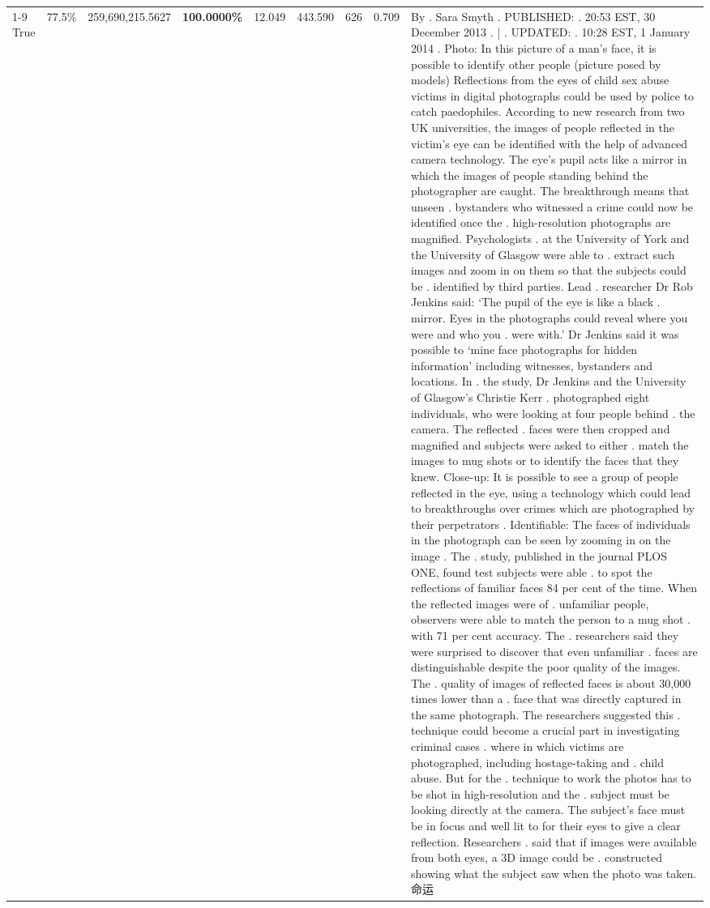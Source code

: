 \begin{table}[H]
\begin{tabular}{lllrlllll}
\cline{1-9}
True & 77.5\% & 259,690,215.5627 & \bfseries \color{red} 100.0000\% & 12.049 & 443.590 & 626 & 0.709 & By . Sara Smyth . PUBLISHED: . 20:53 EST, 30 December 2013 . | . UPDATED: . 10:28 EST, 1 January 2014 . Photo: In this picture of a man's face, it is possible to identify other people (picture posed by models) Reflections from the eyes of child sex abuse victims in digital photographs could be used by police to catch paedophiles. According to new research from two UK universities, the images of people reflected in the victim's eye can be identified with the help of advanced camera technology. The eye's pupil acts like a mirror in which the images of people standing behind the photographer are caught. The breakthrough means that unseen . bystanders who witnessed a crime could now be identified once the . high-resolution photographs are magnified. Psychologists . at the University of York and the University of Glasgow were able to . extract such images and zoom in on them so that the subjects could be . identified by third parties. Lead . researcher Dr Rob Jenkins said: ‘The pupil of the eye is like a black . mirror. Eyes in the photographs could reveal where you were and who you . were with.' Dr Jenkins said it was possible to ‘mine face photographs for hidden information' including witnesses, bystanders and locations. In . the study, Dr Jenkins and the University of Glasgow's Christie Kerr . photographed eight individuals, who were looking at four people behind . the camera. The reflected . faces were then cropped and magnified and subjects were asked to either . match the images to mug shots or to identify the faces that they knew. Close-up: It is possible to see a group of people reflected in the eye, using a technology which could lead to breakthroughs over crimes which are photographed by their perpetrators . Identifiable: The faces of individuals in the photograph can be seen by zooming in on the image . The . study, published in the journal PLOS ONE, found test subjects were able . to spot the reflections of familiar faces 84 per cent of the time. When the reflected images were of . unfamiliar people, observers were able to match the person to a mug shot . with 71 per cent accuracy. The . researchers said they were surprised to discover that even unfamiliar . faces are distinguishable despite the poor quality of the images. The . quality of images of reflected faces is about 30,000 times lower than a . face that was directly captured in the same photograph. The researchers suggested this . technique could become a crucial part in investigating criminal cases . where in which victims are photographed, including hostage-taking and . child abuse. But for the . technique to work the photos has to be shot in high-resolution and the . subject must be looking directly at the camera. The subject's face must be in focus and well lit to for their eyes to give a clear reflection. Researchers . said that if images were available from both eyes, a 3D image could be . constructed showing what the subject saw when the photo was taken.命运 \\

\end{tabular}
\end{table}
